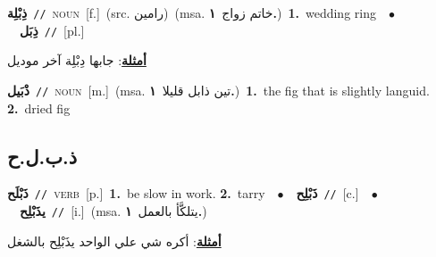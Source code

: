 \documentclass[10pt,a4paper,twoside]{article} %
\begin{document}
\begin{multicols}{2}
{\setlength\topsep{0pt}\textbf{\foreignlanguage{arabic}{ذِبْلِة}}\ {\color{gray}\texttt{//}\color{black}}\ \textsc{noun}\ [f.]\ (src. \color{gray}\foreignlanguage{arabic}{رامين}\color{black})\ \color{gray}(msa. \foreignlanguage{arabic}{خاتم زواج}~\foreignlanguage{arabic}{\textbf{١.}})\color{black}\ \textbf{1.}~wedding ring\ \ $\bullet$\ \ \setlength\topsep{0pt}\textbf{\foreignlanguage{arabic}{ذِبَل}}\ {\color{gray}\texttt{//}\color{black}}\ [pl.]\  \begin{flushright}\color{gray}\foreignlanguage{arabic}{\textbf{\underline{\foreignlanguage{arabic}{أمثلة}}}: جابها دِبْلِة آخر موديل}\end{flushright}\color{black}} \vspace{2mm}

{\setlength\topsep{0pt}\textbf{\foreignlanguage{arabic}{ذْبَيل}}\ {\color{gray}\texttt{//}\color{black}}\ \textsc{noun}\ [m.]\ \color{gray}(msa. \foreignlanguage{arabic}{تين ذابل قليلا}~\foreignlanguage{arabic}{\textbf{١.}})\color{black}\ \textbf{1.}~the fig that is slightly languid.  \textbf{2.}~dried fig\ } \vspace{2mm}

\vspace{-3mm}
\subsection*{\color{blue}\foreignlanguage{arabic}{ذ.ب.ل.ح}\color{blue}{}} 

{\setlength\topsep{0pt}\textbf{\foreignlanguage{arabic}{ذَبْلَح}}\ {\color{gray}\texttt{//}\color{black}}\ \textsc{verb}\ [p.]\ \textbf{1.}~be slow in work.  \textbf{2.}~tarry\ \ $\bullet$\ \ \setlength\topsep{0pt}\textbf{\foreignlanguage{arabic}{ذَبْلِح}}\ {\color{gray}\texttt{//}\color{black}}\ [c.]\ \ $\bullet$\ \ \setlength\topsep{0pt}\textbf{\foreignlanguage{arabic}{يذَبْلِح}}\ {\color{gray}\texttt{//}\color{black}}\ [i.]\ \color{gray}(msa. \foreignlanguage{arabic}{يتلكَّأ بالعمل}~\foreignlanguage{arabic}{\textbf{١.}})\color{black}\  \begin{flushright}\color{gray}\foreignlanguage{arabic}{\textbf{\underline{\foreignlanguage{arabic}{أمثلة}}}: أكره شي علي الواحد يذَبْلِح بالشغل}\end{flushright}\color{black}} \vspace{2mm}


\end{multicols}
\end{document}
